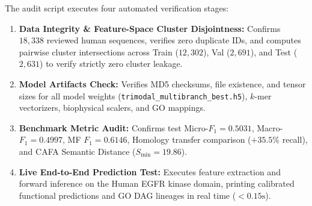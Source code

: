 \documentclass[10pt]{article}
\begin{document}
The audit script executes four automated verification stages:
\begin{enumerate}
    \item \textbf{Data Integrity \& Feature-Space Cluster Disjointness:} Confirms $18,338$ reviewed human sequences, verifies zero duplicate IDs, and computes pairwise cluster intersections across Train ($12,302$), Val ($2,691$), and Test ($2,631$) to verify strictly zero cluster leakage.
    \item \textbf{Model Artifacts Check:} Verifies MD5 checksums, file existence, and tensor sizes for all model weights (\texttt{trimodal\_multibranch\_best.h5}), $k$-mer vectorizers, biophysical scalers, and GO mappings.
    \item \textbf{Benchmark Metric Audit:} Confirms test Micro-$F_1 = 0.5031$, Macro-$F_1 = 0.4997$, MF $F_1 = 0.6146$, Homology transfer comparison ($+35.5\%$ recall), and CAFA Semantic Distance ($S_{\min} = 19.86$).
    \item \textbf{Live End-to-End Prediction Test:} Executes feature extraction and forward inference on the Human EGFR kinase domain, printing calibrated functional predictions and GO DAG lineages in real time ($<0.15\text{s}$).
\end{enumerate}
\end{document}
